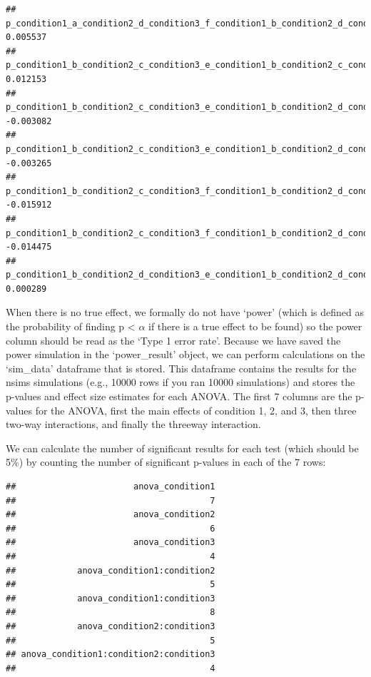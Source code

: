 \documentclass[]{book}
\newenvironment{Shaded}{\begin{snugshade}}{\end{snugshade}}
\newcommand{\ControlFlowTok}[1]{\textcolor[rgb]{0.13,0.29,0.53}{\textbf{#1}}}
\newcommand{\DecValTok}[1]{\textcolor[rgb]{0.00,0.00,0.81}{#1}}
\newcommand{\KeywordTok}[1]{\textcolor[rgb]{0.13,0.29,0.53}{\textbf{#1}}}
\newcommand{\NormalTok}[1]{#1}
\newcommand{\OperatorTok}[1]{\textcolor[rgb]{0.81,0.36,0.00}{\textbf{#1}}}
\newcommand{\StringTok}[1]{\textcolor[rgb]{0.31,0.60,0.02}{#1}}
\begin{document}
\begin{verbatim}
## p_condition1_a_condition2_d_condition3_f_condition1_b_condition2_d_condition3_f    0.005537
## p_condition1_b_condition2_c_condition3_e_condition1_b_condition2_c_condition3_f    0.012153
## p_condition1_b_condition2_c_condition3_e_condition1_b_condition2_d_condition3_e   -0.003082
## p_condition1_b_condition2_c_condition3_e_condition1_b_condition2_d_condition3_f   -0.003265
## p_condition1_b_condition2_c_condition3_f_condition1_b_condition2_d_condition3_e   -0.015912
## p_condition1_b_condition2_c_condition3_f_condition1_b_condition2_d_condition3_f   -0.014475
## p_condition1_b_condition2_d_condition3_e_condition1_b_condition2_d_condition3_f    0.000289
\end{verbatim}

When there is no true effect, we formally do not have `power' (which is defined as the probability of finding p \textless{} \(\alpha\) if there is a true effect to be found) so the power column should be read as the `Type 1 error rate'. Because we have saved the power simulation in the `power\_result' object, we can perform calculations on the `sim\_data' dataframe that is stored. This dataframe contains the results for the nsims simulations (e.g., 10000 rows if you ran 10000 simulations) and stores the p-values and effect size estimates for each ANOVA. The first 7 columns are the p-values for the ANOVA, first the main effects of condition 1, 2, and 3, then three two-way interactions, and finally the threeway interaction.

We can calculate the number of significant results for each test (which should be 5\%) by counting the number of significant p-values in each of the 7 rows:

\begin{Shaded}
\end{Shaded}

\begin{verbatim}
##                       anova_condition1 
##                                      7 
##                       anova_condition2 
##                                      6 
##                       anova_condition3 
##                                      4 
##            anova_condition1:condition2 
##                                      5 
##            anova_condition1:condition3 
##                                      8 
##            anova_condition2:condition3 
##                                      5 
## anova_condition1:condition2:condition3 
##                                      4
\end{verbatim}
\end{document}
